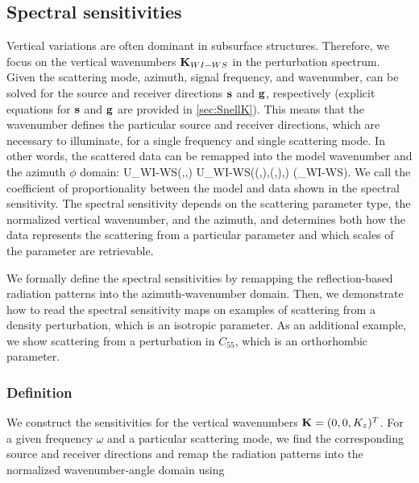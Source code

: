\subsection{Spectral sensitivities}

Vertical variations are often dominant in subsurface structures. Therefore, we focus on the vertical wavenumbers $\mathbf{K}_{WI-WS}$ in the perturbation spectrum. Given the scattering mode, azimuth, signal frequency, and wavenumber,  can be solved for the source and receiver directions $\mathbf{s}$ and $\mathbf{g}$, respectively (explicit equations for $\mathbf{s}$ and $\mathbf{g}$ are provided in \cref{sec:SnellK}). This means that the wavenumber defines the particular source and receiver directions, which are necessary to illuminate, for a single frequency and single scattering mode. In other words, the scattered data can be remapped into the model wavenumber and the azimuth $\phi$ domain:
\beq \label{eq:DataK}
\delta U_{WI-WS}(\Kv,\phi,\omega) \equiv \delta U_{WI-WS}(\sv(\Kv,\phi),\gv(\Kv,\phi),\omega) \propto \delta \mv (\Kv_{WI-WS}).
\eeq
We call the coefficient of proportionality between the model and data shown in  the spectral sensitivity. The spectral sensitivity depends on the scattering parameter type, the normalized vertical wavenumber, and the azimuth, and determines both how the data represents the scattering from a particular parameter and which scales of the parameter are retrievable.

We formally define the spectral sensitivities by remapping the reflection-based radiation patterns into the azimuth-wavenumber domain. Then, we demonstrate how to read the spectral sensitivity maps on examples of scattering from a density perturbation, which is an isotropic parameter. As an additional example, we show scattering from a perturbation in $C_{55}$, which is an orthorhombic parameter.

\subsubsection{Definition}
We construct the sensitivities for the vertical wavenumbers $\mathbf{K} = (0,0,K_z)^T$.
%
For a given frequency $\omega$ and a particular scattering mode, we find the corresponding source and receiver directions and remap the radiation patterns into the normalized wavenumber-angle domain using 

